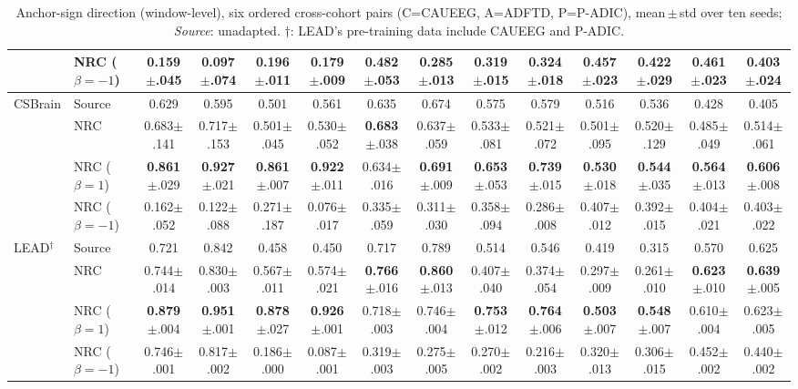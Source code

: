 \documentclass[letterpaper]{article} %
\begin{document}
\begin{table}[!t]
\begin{tabular}{ll cc cc cc cc cc cc}
     & NRC ($\beta{=}{-}1$) & 0.159{$\pm$.045} & 0.097{$\pm$.074} & 0.196{$\pm$.011} & 0.179{$\pm$.009} & 0.482{$\pm$.053} & 0.285{$\pm$.013} & 0.319{$\pm$.015} & 0.324{$\pm$.018} & 0.457{$\pm$.023} & 0.422{$\pm$.029} & 0.461{$\pm$.023} & 0.403{$\pm$.024} \\
    \midrule
    CSBrain & Source & 0.629 & 0.595 & 0.501 & 0.561 & 0.635 & 0.674 & 0.575 & 0.579 & 0.516 & 0.536 & 0.428 & 0.405 \\
     & NRC & 0.683{$\pm$.141} & 0.717{$\pm$.153} & 0.501{$\pm$.045} & 0.530{$\pm$.052} & \textbf{0.683}{$\pm$.038} & 0.637{$\pm$.059} & 0.533{$\pm$.081} & 0.521{$\pm$.072} & 0.501{$\pm$.095} & 0.520{$\pm$.129} & 0.485{$\pm$.049} & 0.514{$\pm$.061} \\
     & NRC ($\beta{=}1$) & \textbf{0.861}{$\pm$.029} & \textbf{0.927}{$\pm$.021} & \textbf{0.861}{$\pm$.007} & \textbf{0.922}{$\pm$.011} & 0.634{$\pm$.016} & \textbf{0.691}{$\pm$.009} & \textbf{0.653}{$\pm$.053} & \textbf{0.739}{$\pm$.015} & \textbf{0.530}{$\pm$.018} & \textbf{0.544}{$\pm$.035} & \textbf{0.564}{$\pm$.013} & \textbf{0.606}{$\pm$.008} \\
     & NRC ($\beta{=}{-}1$) & 0.162{$\pm$.052} & 0.122{$\pm$.088} & 0.271{$\pm$.187} & 0.076{$\pm$.017} & 0.335{$\pm$.059} & 0.311{$\pm$.030} & 0.358{$\pm$.094} & 0.286{$\pm$.008} & 0.407{$\pm$.012} & 0.392{$\pm$.015} & 0.404{$\pm$.021} & 0.403{$\pm$.022} \\
    \midrule
    LEAD$^\dagger$ & Source & 0.721 & 0.842 & 0.458 & 0.450 & 0.717 & 0.789 & 0.514 & 0.546 & 0.419 & 0.315 & 0.570 & 0.625 \\
     & NRC & 0.744{$\pm$.014} & 0.830{$\pm$.003} & 0.567{$\pm$.011} & 0.574{$\pm$.021} & \textbf{0.766}{$\pm$.016} & \textbf{0.860}{$\pm$.013} & 0.407{$\pm$.040} & 0.374{$\pm$.054} & 0.297{$\pm$.009} & 0.261{$\pm$.010} & \textbf{0.623}{$\pm$.010} & \textbf{0.639}{$\pm$.005} \\
     & NRC ($\beta{=}1$) & \textbf{0.879}{$\pm$.004} & \textbf{0.951}{$\pm$.001} & \textbf{0.878}{$\pm$.027} & \textbf{0.926}{$\pm$.001} & 0.718{$\pm$.003} & 0.746{$\pm$.004} & \textbf{0.753}{$\pm$.012} & \textbf{0.764}{$\pm$.006} & \textbf{0.503}{$\pm$.007} & \textbf{0.548}{$\pm$.007} & 0.610{$\pm$.004} & 0.623{$\pm$.005} \\
     & NRC ($\beta{=}{-}1$) & 0.746{$\pm$.001} & 0.817{$\pm$.002} & 0.186{$\pm$.000} & 0.087{$\pm$.001} & 0.319{$\pm$.003} & 0.275{$\pm$.005} & 0.270{$\pm$.002} & 0.216{$\pm$.003} & 0.320{$\pm$.013} & 0.306{$\pm$.015} & 0.452{$\pm$.002} & 0.440{$\pm$.002} \\
    \bottomrule\end{tabular}
    \caption{Anchor-sign direction (window-level), six ordered cross-cohort pairs
    (C=CAUEEG, A=ADFTD, P=P-ADIC), mean\,$\pm$\,std over ten seeds; \emph{Source}: unadapted.
    $\dagger$: LEAD's pre-training data include CAUEEG and P-ADIC.}
    \label{tab:beta}
    \end{table}
\end{document}
